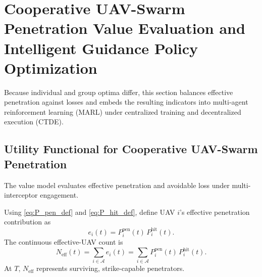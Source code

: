 \documentclass{cja}
\begin{document}
\section{Cooperative UAV-Swarm Penetration Value Evaluation and Intelligent Guidance Policy Optimization}

Because individual and group optima differ, this section balances effective penetration against losses and embeds the resulting indicators into multi-agent reinforcement learning (MARL) under centralized training and decentralized execution (CTDE).

\subsection{Utility Functional for Cooperative UAV-Swarm Penetration}

The value model evaluates effective penetration and avoidable loss under multi-interceptor engagement.

Using \eqref{eq:P_pen_def} and \eqref{eq:P_hit_def}, define UAV $i$'s effective penetration contribution as
\begin{equation}
e_i(t)
=
P_i^{\mathrm{pen}}(t)\,P_i^{\mathrm{hit}}(t).
\end{equation}
The continuous effective-UAV count is
\begin{equation}
N_{\mathrm{eff}}(t)
=
\sum_{i\in\mathcal{A}} e_i(t)
=
\sum_{i\in\mathcal{A}} P_i^{\mathrm{pen}}(t)\,P_i^{\mathrm{hit}}(t).
\end{equation}
At $T$, $N_{\mathrm{eff}}$ represents surviving, strike-capable penetrators.
\end{document}
